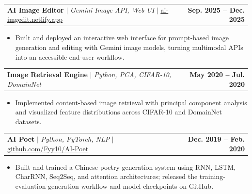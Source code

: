 \documentclass[letterpaper,11pt]{article}
\makeatletter
\newcommand{\resumeItem}[1]{
  \item\small{
    {#1 \vspace{-2pt}}
  }
}
\newcommand{\resumeProjectHeading}[2]{
    \item
    \begin{tabular*}{1.0\textwidth}{l@{\extracolsep{\fill}}r}
      \small#1 & \textbf{\small #2}\\
    \end{tabular*}\vspace{-7pt}
}
\newcommand{\resumeItemListStart}{\begin{itemize}}
\newcommand{\resumeItemListEnd}{\end{itemize}\vspace{-5pt}}
\makeatother
\begin{document}
\resumeProjectHeading
{\textbf{AI Image Editor} $|$ \emph{Gemini Image API, Web UI} $|$ \href{https://ai-imgedit.netlify.app/}{\underline{ai-imgedit.netlify.app}}}
{Sep. 2025 -- Dec. 2025}
\resumeItemListStart
    \resumeItem{Built and deployed an interactive web interface for prompt-based image generation and editing with Gemini image models, turning multimodal APIs into an accessible end-user workflow.}
\resumeItemListEnd

\vspace{-4pt}

\resumeProjectHeading
{\textbf{Image Retrieval Engine} $|$ \emph{Python, PCA, CIFAR-10, DomainNet}}{May 2020 -- Jul. 2020}
\resumeItemListStart
    \resumeItem{Implemented content-based image retrieval with principal component analysis and visualized feature distributions across CIFAR-10 and DomainNet datasets.}
\resumeItemListEnd

\vspace{-4pt}

\resumeProjectHeading
{\textbf{AI Poet} $|$ \emph{Python, PyTorch, NLP} $|$ \href{https://github.com/Fyy10/AI-Poet}{\underline{github.com/Fyy10/AI-Poet}}}{Dec. 2019 -- Feb. 2020}
\resumeItemListStart
    \resumeItem{Built and trained a Chinese poetry generation system using RNN, LSTM, CharRNN, Seq2Seq, and attention architectures; released the training-evaluation-generation workflow and model checkpoints on GitHub.}
\resumeItemListEnd




\end{document}
